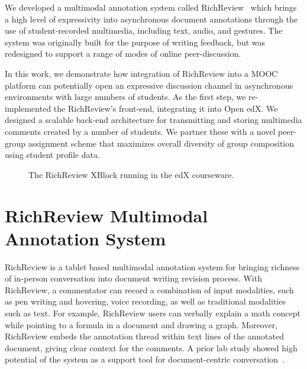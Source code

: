 \documentclass{sigchi}
\begin{document}
We developed a multimodal annotation system called RichReview~\cite{yoon2014richreview} which brings a high level of expressivity into asynchronous document annotations through the use of student-recorded multimedia, including text, audio, and gestures.
The system was originally built for the purpose of writing feedback, but was redesigned to support a range of modes of online peer-discussion.

In this work, we demonstrate how integration of RichReview into a MOOC platform can potentially open an expressive discussion channel in asynchronous environments with large numbers of students.
As the first step, we re-implemented the RichReview's front-end, integrating it into Open edX. We designed a scalable back-end architecture for transmitting and storing multimedia comments created by a number of students.
We partner these with a novel peer-group assignment scheme that maximizes overall diversity of group composition using student profile data.

\begin{figure}[!h]
\centering
{
\setlength{\fboxsep}{0pt}
\setlength{\fboxrule}{0.5pt}
}
\caption{The RichReview XBlock running in the edX courseware.}
\label{fig:screenshot}
\end{figure}


\section{RichReview Multimodal Annotation System}
RichReview is a tablet based multimodal annotation system for bringing richness of in-person conversation into document writing revision process.
With RichReview, a commentator can record a combination of input modalities, such as pen writing and hovering, voice recording, as well as traditional modalities such as text.
For example, RichReview users can verbally explain a math concept while pointing to a formula in a document and drawing a graph.
Moreover, RichReview embeds the annotation thread within text lines of the annotated document, giving clear context for the comments.
A prior lab study showed high potential of the system as a support tool for document-centric conversation~\cite{yoon2014richreview}.
\end{document}
